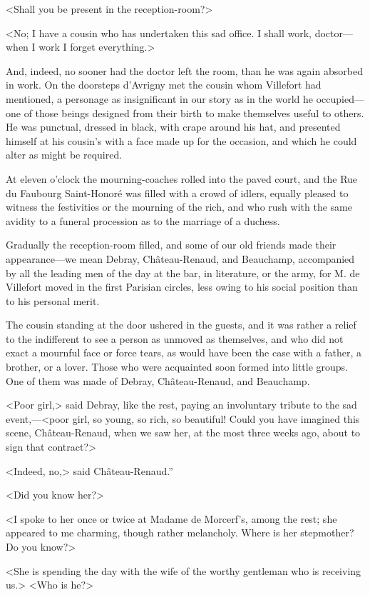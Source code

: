  <Shall you be present in the reception-room?> 

 <No; I have a cousin who has undertaken this sad office. I shall work, doctor—when I work I forget everything.> 

 And, indeed, no sooner had the doctor left the room, than he was again absorbed in work. On the doorsteps d'Avrigny met the cousin whom Villefort had mentioned, a personage as insignificant in our story as in the world he occupied—one of those beings designed from their birth to make themselves useful to others. He was punctual, dressed in black, with crape around his hat, and presented himself at his cousin's with a face made up for the occasion, and which he could alter as might be required. 

 At eleven o'clock the mourning-coaches rolled into the paved court, and the Rue du Faubourg Saint-Honoré was filled with a crowd of idlers, equally pleased to witness the festivities or the mourning of the rich, and who rush with the same avidity to a funeral procession as to the marriage of a duchess. 

 Gradually the reception-room filled, and some of our old friends made their appearance—we mean Debray, Château-Renaud, and Beauchamp, accompanied by all the leading men of the day at the bar, in literature, or the army, for M. de Villefort moved in the first Parisian circles, less owing to his social position than to his personal merit. 

 The cousin standing at the door ushered in the guests, and it was rather a relief to the indifferent to see a person as unmoved as themselves, and who did not exact a mournful face or force tears, as would have been the case with a father, a brother, or a lover. Those who were acquainted soon formed into little groups. One of them was made of Debray, Château-Renaud, and Beauchamp. 

 <Poor girl,> said Debray, like the rest, paying an involuntary tribute to the sad event,—<poor girl, so young, so rich, so beautiful! Could you have imagined this scene, Château-Renaud, when we saw her, at the most three weeks ago, about to sign that contract?> 

 <Indeed, no,> said Château-Renaud.” 

 <Did you know her?> 

 <I spoke to her once or twice at Madame de Morcerf's, among the rest; she appeared to me charming, though rather melancholy. Where is her stepmother? Do you know?> 

 <She is spending the day with the wife of the worthy gentleman who is receiving us.>  <Who is he?> 


